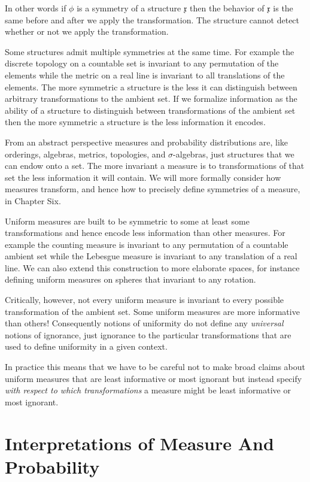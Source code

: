 \documentclass[
  letterpaper,
  DIV=11,
  numbers=noendperiod]{scrartcl}
\begin{document}
In other words if \(\phi\) is a symmetry of a structure \(\mathfrak{x}\)
then the behavior of \(\mathfrak{x}\) is the same before and after we
apply the transformation. The structure cannot detect whether or not we
apply the transformation.

Some structures admit multiple symmetries at the same time. For example
the discrete topology on a countable set is invariant to any permutation
of the elements while the metric on a real line is invariant to all
translations of the elements. The more symmetric a structure is the less
it can distinguish between arbitrary transformations to the ambient set.
If we formalize information as the ability of a structure to distinguish
between transformations of the ambient set then the more symmetric a
structure is the less information it encodes.

From an abstract perspective measures and probability distributions are,
like orderings, algebras, metrics, topologies, and \(\sigma\)-algebras,
just structures that we can endow onto a set. The more invariant a
measure is to transformations of that set the less information it will
contain. We will more formally consider how measures transform, and
hence how to precisely define symmetries of a measure, in Chapter Six.

Uniform measures are built to be symmetric to some at least some
transformations and hence encode less information than other measures.
For example the counting measure is invariant to any permutation of a
countable ambient set while the Lebesgue measure is invariant to any
translation of a real line. We can also extend this construction to more
elaborate spaces, for instance defining uniform measures on spheres that
invariant to any rotation.

Critically, however, not every uniform measure is invariant to every
possible transformation of the ambient set. Some uniform measures are
more informative than others! Consequently notions of uniformity do not
define any \emph{universal} notions of ignorance, just ignorance to the
particular transformations that are used to define uniformity in a given
context.

In practice this means that we have to be careful not to make broad
claims about uniform measures that are least informative or most
ignorant but instead specify \emph{with respect to which
transformations} a measure might be least informative or most ignorant.

\hypertarget{interpretations-of-measure-and-probability}{%
\section{Interpretations of Measure And
Probability}\label{interpretations-of-measure-and-probability}}
\end{document}
